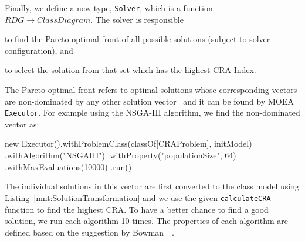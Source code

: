 Finally, we define a new type, \texttt{Solver}, which is a function $RDG \rightarrow ClassDiagram$.
The solver is responsible
%
\begin{inparaenum}[(1)]
  \item to find the Pareto optimal front of all possible solutions (subject to solver configuration), and
  \item to select the solution from that set which has the highest CRA-Index.
\end{inparaenum}
The Pareto optimal front refers to optimal solutions whose corresponding vectors are non-dominated by any other solution vector~\cite{bowman2010solving} and it can be found by MOEA \texttt{Executor}.
For example using the NSGA-III algorithm, we find the non-dominated vector as:
%
\begin{scalacode}
new Executor().withProblemClass(classOf[CRAProblem], initModel)
              .withAlgorithm("NSGAIII")
              .withProperty("populationSize", 64)
              .withMaxEvaluations(10000)
              .run()
\end{scalacode}
%
The individual solutions in this vector are first converted to the class model using Listing~\ref{mnt:SolutionTransformation} and we use the given \texttt{calculateCRA} function to find the highest CRA.
To have a better chance to find a good solution, we run each algorithm 10 times.
The properties of each algorithm are defined based on the suggestion by Bowman~\Etal~\cite{bowman2010solving}.

